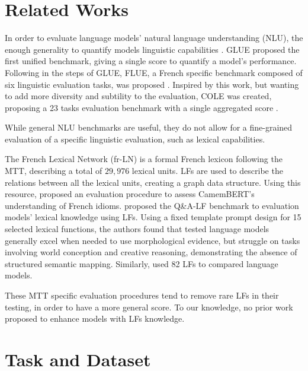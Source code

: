 \documentclass[11pt]{article}
\begin{document}
\section{Related Works}\label{sec:relwork}
In order to evaluate language models' natural language understanding (NLU), the
enough generality to quantify models linguistic capabilities
\citep{niSurveyLargeLanguage2025}. GLUE \cite{niSurveyLargeLanguage2025}
proposed the first unified benchmark, giving a single score to quantify a
model's performance. Following in the steps of GLUE,
FLUE, a French specific benchmark composed of six linguistic evaluation tasks,
was proposed \citep{leFlauBERTUnsupervisedLanguage2020}. Inspired by this work,
but wanting to add more diversity and subtility to the evaluation, COLE was
created, proposing a 23 tasks evaluation benchmark with a single aggregated
score \citep{beaucheminCOLEComprehensiveBenchmark2025}. 

While general NLU benchmarks are useful, they do not allow for a fine-grained
evaluation of a specific linguistic evaluation, such as lexical capabilities.

The French Lexical Network (fr-LN) \citep{11403/lexical-system-fr/v3.2} is a
formal French lexicon following the MTT, describing a total of $29,976$ lexical
units. LFs are used to describe the relations between all the lexical units,
creating a graph data structure. Using this resource,
\citet{liuAssessingBERTsSensitivity2024} proposed 
an evaluation procedure to assess CamemBERT's \cite{martin-etal-2020-camembert}
understanding of French idioms. \citet{petrovQALFFrenchQuestionAnswering2025}
proposed the Q\&A-LF benchmark to evaluation models' lexical knowledge using
LFs. Using a fixed template prompt design for 15 selected lexical functions,
the authors found that tested language models generally excel when needed to use
morphological evidence, but struggle on tasks involving world conception and
creative reasoning, demonstrating the absence of structured semantic
mapping. Similarly, \citet{liEvaluationCompetenceLexicale2025} used 82 LFs to
compared language models.

These MTT specific evaluation procedures tend to remove rare LFs in their
testing, in order to have a more general score. To our knowledge, no prior work
proposed to enhance models with LFs knowledge.


\section{Task and Dataset} \label{sec:task}
\end{document}
